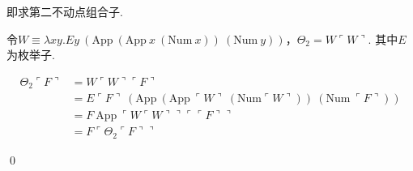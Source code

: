 \newcommand{\app}{\mathrm{App}}
\newcommand{\num}{\mathrm{Num}}

\begin{pf} \rm 即求第二不动点组合子.

    令$W\equiv \lambda xy. Ey\ (\app\ (\app\ x\ (\num\ x)) \ (\num\ y))$，$\Theta_2 = W\ulcorner W \urcorner$. 其中$E$为枚举子.

$$
\begin{aligned}
\Theta_2\ulcorner F\urcorner 
&= W  \ulcorner W\urcorner \ulcorner F\urcorner\\
&= E \ulcorner F\urcorner\ (\app\ (\app\ \ulcorner W\urcorner\ (\num \ulcorner W\urcorner))\ (\num\ \ulcorner F\urcorner))\\
&= F\ \app\ \ulcorner W \ulcorner W\urcorner\urcorner \ulcorner \ulcorner F\urcorner\urcorner\\
&= F \ulcorner \Theta_2 \ulcorner F\urcorner\urcorner
\end{aligned}    
$$
   
   \qed
\end{pf}